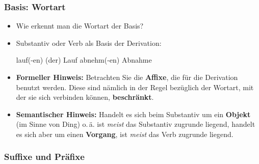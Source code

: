 \begin{frame}
\frametitle{Basis: Wortart}

\begin{itemize}
	\item Wie erkennt man die Wortart der Basis?
	
		\item Substantiv oder Verb als Basis der Derivation:
		
		\eal 
			\ex lauf(-en) \ras (der) Lauf
			\ex abnehm(-en) \ras Abnahme
		\zl


		\item \textbf{Formeller Hinweis:} Betrachten Sie die \textbf{Affixe}, die für die Derivation benutzt werden. Diese sind nämlich in der Regel bezüglich der Wortart, mit der sie sich verbinden können, \textbf{beschränkt}.
		
\medskip
				
		\item \textbf{Semantischer Hinweis:} Handelt es sich beim Substantiv um ein \textbf{Objekt} (im Sinne von Ding) o.\,ä. ist \emph{meist} das Substantiv zugrunde liegend, handelt es sich aber um einen \textbf{Vorgang}, ist \emph{meist} das Verb zugrunde liegend.
		
%	
\end{itemize}

\end{frame}


\subsubsection{Suffixe und Präfixe}

